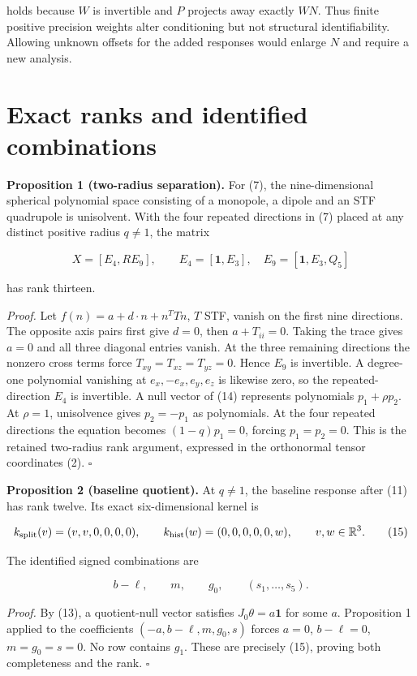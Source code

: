 holds because \(W\) is invertible and \(P\) projects away exactly \(WN\). Thus finite positive precision weights alter conditioning but not structural identifiability. Allowing unknown offsets for the added responses would enlarge \(N\) and require a new analysis.

\hypertarget{exact-ranks-and-identified-combinations}{%
\section{Exact ranks and identified combinations}\label{exact-ranks-and-identified-combinations}}

\textbf{Proposition 1 (two-radius separation).} For (7), the nine-dimensional spherical polynomial space consisting of a monopole, a dipole and an STF quadrupole is unisolvent. With the four repeated directions in (7) placed at any distinct positive radius \(q\ne1\), the matrix

\[
X=[E_4,RE_9],\qquad E_4=[\mathbf1,E_3],\quad
E_9=[\mathbf1,E_3,Q_5]                                  \tag{14}
\]

has rank thirteen.

\emph{Proof.} Let \(f(n)=a+d\cdot n+n^TTn\), \(T\) STF, vanish on the first nine directions. The opposite axis pairs first give \(d=0\), then \(a+T_{ii}=0\). Taking the trace gives \(a=0\) and all three diagonal entries vanish. At the three remaining directions the nonzero cross terms force \(T_{xy}=T_{xz}=T_{yz}=0\). Hence \(E_9\) is invertible. A degree-one polynomial vanishing at \(e_x,-e_x,e_y,e_z\) is likewise zero, so the repeated-direction \(E_4\) is invertible. A null vector of (14) represents polynomials \(p_1+\rho p_2\). At \(\rho=1\), unisolvence gives \(p_2=-p_1\) as polynomials. At the four repeated directions the equation becomes \((1-q)p_1=0\), forcing \(p_1=p_2=0\). This is the retained two-radius rank argument, expressed in the orthonormal tensor coordinates (2). \(\square\)

\textbf{Proposition 2 (baseline quotient).} At \(q\ne1\), the baseline response after (11) has rank twelve. Its exact six-dimensional kernel is

\[
k_{\rm split}(v)=(v,v,0,0,0,0),\qquad
k_{\rm hist}(w)=(0,0,0,0,0,w),\qquad v,w\in\mathbb R^3.    \tag{15}
\]

The identified signed combinations are

\[
b-\ell,\qquad m,\qquad g_0,\qquad(s_1,\ldots,s_5).       \tag{16}
\]

\emph{Proof.} By (13), a quotient-null vector satisfies \(J_0\theta=a\mathbf1\) for some \(a\). Proposition 1 applied to the coefficients \((-a,b-\ell,m,g_0,s)\) forces \(a=0\), \(b-\ell=0\), \(m=g_0=s=0\). No row contains \(g_1\). These are precisely (15), proving both completeness and the rank. \(\square\)

